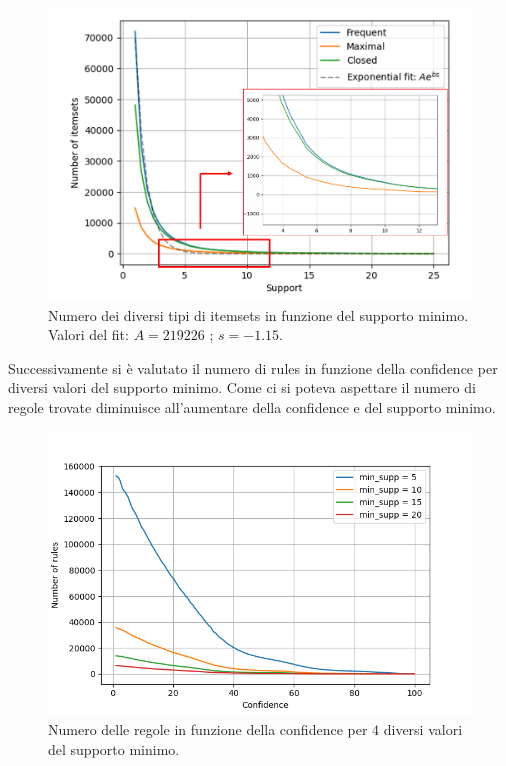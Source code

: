 \documentclass[a4paper,9pt]{article}
\begin{document}
\begin{figure}[H]
    \centering
    \includegraphics[scale=0.65]{Frequen,_maximal_and_closed_itemsets da inserire.png}
    \caption{Numero dei diversi tipi di itemsets in funzione del supporto minimo.\\Valori del fit: $A=219226$ ; $s=-1.15$. }
    \label{fig:my_label}
\end{figure}

Successivamente si è valutato il numero di rules in funzione della confidence per diversi valori del supporto minimo. Come ci si poteva aspettare il numero di regole trovate diminuisce all'aumentare della confidence e del supporto minimo.

\begin{figure}[H]
    \centering
    \includegraphics[scale=0.65]{Confidence_figure.png}
    \caption{Numero delle regole in funzione della confidence per $4$ diversi valori del supporto minimo.}
    \label{fig:my_label}
\end{figure}
\end{document}
